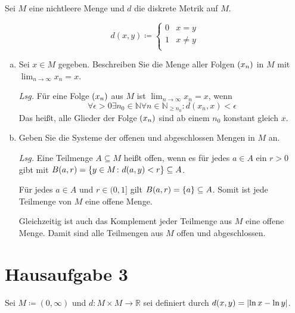 \documentclass{article}
\begin{document}
Sei $M$ eine nichtleere Menge und $d$ die diskrete Metrik auf $M$.

\[
  d(x, y) \coloneqq \begin{cases}
    0 & x = y \\
    1 & x \ne y \\
  \end{cases}
\]

\begin{enumerate}[a)]
\item Sei $x \in M$ gegeben. Beschreiben Sie die Menge aller Folgen $\qty(x_n)$ in $M$
  mit $\lim_{n \to \infty} x_n = x$.

  \textit{Lsg.} Für eine Folge $\qty(x_n)$ aus $M$ ist $\lim_{n \to \infty} x_n = x$,
  wenn
  \[
    \forall \epsilon > 0 \exists n_0 \in \mathbb{N} \forall n \in \mathbb{N}_{\geq n_0} \colon d(x_n, x) < \epsilon
  \]
  Das heißt, alle Glieder der Folge $\qty(x_n)$ sind ab einem $n_0$ konstant gleich $x$.
\newpage
\item Geben Sie die Systeme der offenen und abgeschlossen Mengen in $M$ an.

  \textit{Lsg.} Eine Teilmenge $A \subseteq M$ heißt offen, wenn es für jedes $a \in A$
  ein $r > 0$ gibt mit $B(a, r) = \qty{y \in M \colon d(a, y) < r} \subseteq A$.

  Für jedes $a \in A$ und $r \in (0, 1]$ gilt $B(a, r) = \qty{a} \subseteq{A}$.
  Somit ist jede Teilmenge von $M$ eine offene Menge.

  Gleichzeitig ist auch das Komplement jeder Teilmenge aus $M$ eine offene Menge.
  Damit sind alle Teilmengen aus $M$ offen und abgeschlossen.
\end{enumerate}

\section*{Hausaufgabe 3}

Sei $M \coloneqq (0, \infty)$ und $d \colon M \times M \to \mathbb{R}$ sei definiert durch
$d(x, y) = \abs{\ln x - \ln y}$.
\end{document}
